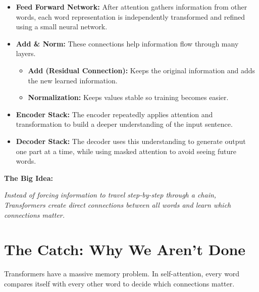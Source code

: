 \documentclass[11pt]{article}
\begin{document}
\begin{itemize}[leftmargin=*, itemsep=0.1in]

    \item \textbf{Feed Forward Network:}  
    After attention gathers information from other words, each word representation is independently transformed and refined using a small neural network.

    \item \textbf{Add \& Norm:}  
    These connections help information flow through many layers.
    
    \begin{itemize}
        \item \textbf{Add (Residual Connection):} Keeps the original information and adds the new learned information.
        \item \textbf{Normalization:} Keeps values stable so training becomes easier.
    \end{itemize}

    \item \textbf{Encoder Stack:}  
    The encoder repeatedly applies attention and transformation to build a deeper understanding of the input sentence.

    \item \textbf{Decoder Stack:}  
    The decoder uses this understanding to generate output one part at a time, while using masked attention to avoid seeing future words.

\end{itemize}

\vspace{0.1in}

\textbf{The Big Idea:}

\begin{center}
\textit{Instead of forcing information to travel step-by-step through a chain, Transformers create direct connections between all words and learn which connections matter.}
\end{center}

\section*{The Catch: Why We Aren't Done}

\vspace{0.05in}

Transformers have a massive memory problem. In self-attention, every word compares itself with every other word to decide which connections matter.
\end{document}
